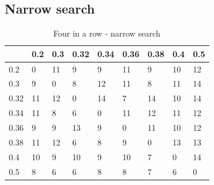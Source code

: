 \documentclass[
11pt, %
english, %
singlespacing, %
headsepline, %
]{MastersDoctoralThesis} %
\begin{document}
\begin{appendices}
\subsection{Narrow search}
\begin{table}[H]
	\centering
	\begin{tabular}{|l||l|l|l|l|l|l|l|l|}
		\hline
		& 0.2 & 0.3 & 0.32 & 0.34 & 0.36 & 0.38 & 0.4 & 0.5 \\ \hline\hline
		0.2  & 0   & 11  & 9    & 9    & 11   & 9    & 10  & 12  \\ \hline
		0.3  & 9   & 0   & 8    & 12   & 11   & 8    & 11  & 14  \\ \hline
		0.32 & 11  & 12  & 0    & 14   & 7    & 14   & 10  & 14  \\ \hline
		0.34 & 11  & 8   & 6    & 0    & 11   & 12   & 11  & 12  \\ \hline
		0.36 & 9   & 9   & 13   & 9    & 0    & 11   & 10  & 12  \\ \hline
		0.38 & 11  & 12  & 6    & 8    & 9    & 0    & 13  & 13  \\ \hline
		0.4  & 10  & 9   & 10   & 9    & 10   & 7    & 0   & 14  \\ \hline
		0.5  & 8   & 6   & 6    & 8    & 8    & 7    & 6   & 0   \\ \hline
	\end{tabular}
	\caption{Four in a row - narrow search}
	\label{table:fourinarow-narrow}
\end{table}


\end{appendices}
\end{document}

